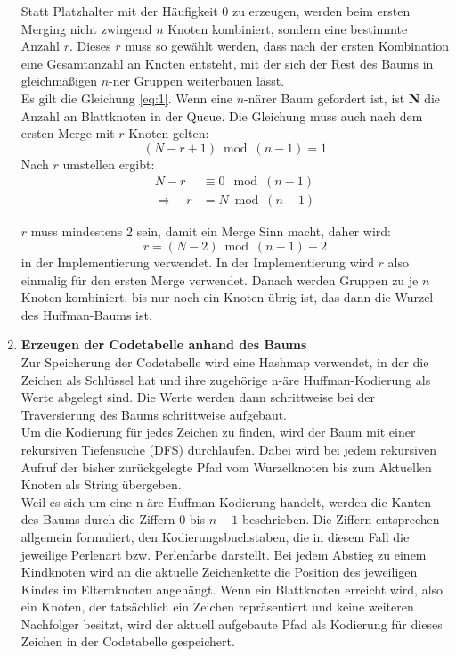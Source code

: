 \documentclass[a4paper,10pt,ngerman]{scrartcl}
\begin{document}
\begin{enumerate}
  Statt Platzhalter mit der Häufigkeit 0 zu erzeugen, werden beim ersten Merging nicht zwingend $n$ Knoten kombiniert, sondern eine bestimmte Anzahl $r$. Dieses $r$ muss so gewählt werden, dass nach der ersten Kombination eine Gesamtanzahl an Knoten entsteht, mit der sich der Rest des Baums in gleichmäßigen $n$-ner Gruppen weiterbauen lässt.\\
  \newline
  Es gilt die Gleichung \ref{eq:1}.
  \newline
  Wenn eine $n$-närer Baum gefordert ist, ist \textbf{N} die Anzahl an Blattknoten in der Queue. Die Gleichung muss auch nach dem ersten Merge mit $r$ Knoten gelten:
  \begin{equation*}
     (N-r+1) \bmod (n-1) = 1
  \end{equation*}
  Nach $r$ umstellen ergibt:
  \begin{align*}
    N - r &\equiv 0 \mod(n - 1) \\
    \Rightarrow \quad r &= N \bmod(n - 1) 
  \end{align*}

  $r$ muss mindestens 2 sein, damit ein Merge Sinn macht, daher wird:
  \begin{equation}
    r = (N - 2) \bmod (n - 1) + 2
    \label{eq:2}
  \end{equation}
  in der Implementierung verwendet.
  \newline
  In der Implementierung wird $r$ also einmalig für den ersten Merge verwendet. Danach werden Gruppen zu je $n$ Knoten kombiniert, bis nur noch ein Knoten übrig ist, das dann die Wurzel des Huffman-Baums ist.
  \item \textbf{Erzeugen der Codetabelle anhand des Baums} \\
  Zur Speicherung der Codetabelle wird eine Hashmap verwendet, in der die Zeichen als Schlüssel hat und ihre zugehörige n-äre Huffman-Kodierung als Werte abgelegt sind. Die Werte werden dann schrittweise bei der Traversierung des Baums schrittweise aufgebaut. \\
  Um die Kodierung für jedes Zeichen zu finden, wird der Baum mit einer rekursiven Tiefensuche (DFS) durchlaufen. Dabei wird bei jedem rekursiven Aufruf der bisher zurückgelegte Pfad vom Wurzelknoten bis zum Aktuellen Knoten als String übergeben.  \\
  \newline
  Weil es sich um eine n-äre Huffman-Kodierung handelt, werden die Kanten des Baums durch die Ziffern $0$ bis $n-1$ beschrieben. Die Ziffern entsprechen allgemein formuliert, den Kodierungsbuchstaben, die in diesem Fall die jeweilige Perlenart bzw. Perlenfarbe darstellt. Bei jedem Abstieg zu einem Kindknoten wird an die aktuelle Zeichenkette die Position des jeweiligen Kindes im Elternknoten angehängt. Wenn ein Blattknoten erreicht wird, also ein Knoten, der tatsächlich ein Zeichen repräsentiert und keine weiteren Nachfolger besitzt, wird der aktuell aufgebaute Pfad als Kodierung für dieses Zeichen in der Codetabelle gespeichert. 


\end{enumerate}
\end{document}
